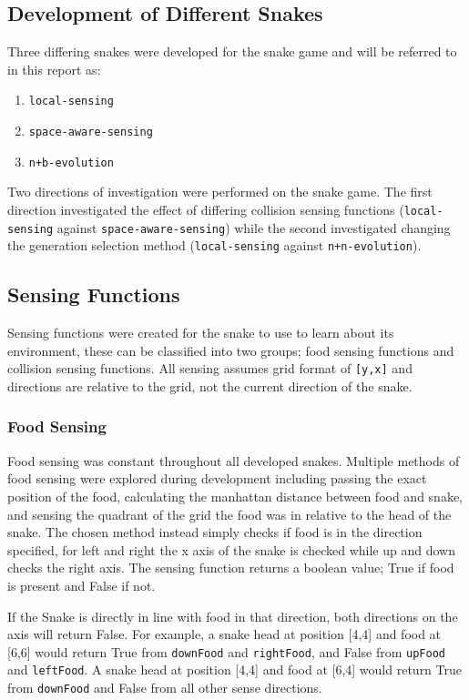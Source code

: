 \subsection{Development of Different Snakes}
Three differing snakes were developed for the snake game and will be referred to in this report as:
\begin{enumerate}
  \item \verb|local-sensing|
  \item \verb|space-aware-sensing|
  \item \verb|n+b-evolution|
\end{enumerate}
Two directions of investigation were performed on the snake game. The first direction investigated the effect of differing collision sensing functions (\verb|local-sensing| against \verb|space-aware-sensing|) while the second investigated changing the generation selection method (\verb|local-sensing| against \verb|n+n-evolution|).

\subsection{Sensing Functions}
Sensing functions were created for the snake to use to learn about its environment, these can be classified into two groups; food sensing functions and collision sensing functions. All sensing assumes grid format of \verb|[y,x]| and directions are relative to the grid, not the current direction of the snake.

\subsubsection{Food Sensing}
Food sensing was constant throughout all developed snakes. Multiple methods of food sensing were explored during development including passing the exact position of the food, calculating the manhattan distance between food and snake, and sensing the quadrant of the grid the food was in relative to the head of the snake. The chosen method instead simply checks if food is in the direction specified, for left and right the x axis of the snake is checked while up and down checks the right axis. The sensing function returns a boolean value; True if food is present and False if not. 

If the Snake is directly in line with food in that direction, both directions on the axis will return False. For example, a snake head at position [4,4] and food at [6,6] would return True from \verb|downFood| and \verb|rightFood|, and False from \verb|upFood| and \verb|leftFood|. A snake head at position [4,4] and food at [6,4] would return True from \verb|downFood| and False from all other sense directions.

